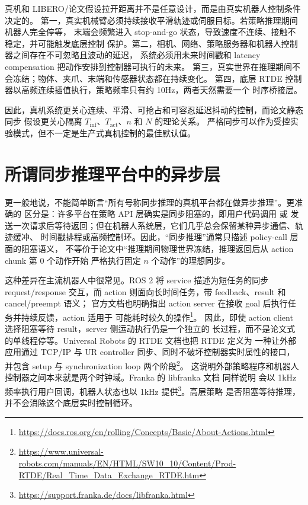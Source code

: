 \documentclass[UTF8,11pt]{ctexart}
\newcommand{\code}[1]{\texttt{\detokenize{#1}}}
\begin{document}
真机和 LIBERO/论文假设拉开距离并不是任意设计，而是由真实机器人控制条件决定的。
第一，真实机械臂必须持续接收平滑轨迹或伺服目标。若策略推理期间机器人完全停等，
末端会频繁进入 stop-and-go 状态，导致速度不连续、接触不稳定，并可能触发底层控制
保护。第二，相机、网络、策略服务器和机器人控制器之间存在不可忽略且波动的延迟，
系统必须用未来时间戳和 latency compensation 把动作安排到控制器可执行的未来。
第三，真实世界在推理期间不会冻结；物体、夹爪、末端和传感器状态都在持续变化。
第四，底层 RTDE 控制器以高频连续插值执行，策略频率只有约 10Hz，两者天然需要一个
时序桥接层。

因此，真机系统更关心连续、平滑、可抢占和可容忍延迟抖动的控制，而论文静态同步
假设更关心隔离 \(T_{\mathrm{inf}}\)、\(T_{\mathrm{act}}\)、\(n\) 和 \(N\) 的理论关系。
严格同步可以作为受控实验模式，但不一定是生产式真机控制的最佳默认值。

\section{所谓同步推理平台中的异步层}

更一般地说，不能简单断言“所有号称同步推理的真机平台都在做异步推理”。更准确的
区分是：许多平台在策略 API 层确实是同步阻塞的，即用户代码调用 \code{infer()} 或
发送一次请求后等待返回；但在机器人系统层，它们几乎总会保留某种异步通信、轨迹缓冲、
时间戳排程或高频控制环。因此，“同步推理”通常只描述 policy-call 层面的阻塞语义，
不等价于论文中“推理期间物理世界冻结，推理返回后从 action chunk 第 0 个动作开始
严格执行固定 \(n\) 个动作”的理想同步。

这种差异在主流机器人中很常见。ROS 2 将 service 描述为短任务的同步 request/response
交互，而 action 则面向长时间任务，带 feedback、result 和 cancel/preempt 语义；
官方文档也明确指出 action server 在接收 goal 后执行任务并持续反馈，action 适用于
可能耗时较久的操作\footnote{\url{https://docs.ros.org/en/rolling/Concepts/Basic/About-Actions.html}}。
因此，即使 action client 选择阻塞等待 result，server 侧运动执行仍是一个独立的
长过程，而不是论文式的单线程停等。Universal Robots 的 RTDE 文档也把 RTDE 定义为
一种让外部应用通过 TCP/IP 与 UR controller 同步、同时不破坏控制器实时属性的接口，
并包含 setup 与 synchronization loop 两个阶段\footnote{\url{https://www.universal-robots.com/manuals/EN/HTML/SW10_10/Content/Prod-RTDE/Real_Time_Data_Exchange_RTDE.htm}}。
这说明外部策略程序和机器人控制器之间本来就是两个时钟域。Franka 的 libfranka 文档
同样说明 \code{franka::Robot::control} 会以 1kHz 频率执行用户回调，机器人状态也以
1kHz 提供\footnote{\url{https://support.franka.de/docs/libfranka.html}}。高层策略
是否阻塞等待推理，并不会消除这个底层实时控制循环。
\end{document}
